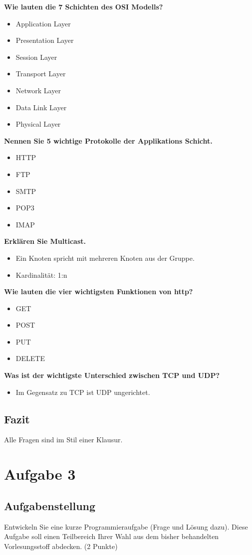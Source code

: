 \textbf{Wie lauten die 7 Schichten des OSI Modells?}
\begin{itemize}
	\item Application Layer
	\item Presentation Layer
	\item Session Layer
	\item Transport Layer
	\item Network Layer
	\item Data Link Layer
	\item Physical Layer
\end{itemize}
\textbf{Nennen Sie 5 wichtige Protokolle der Applikations Schicht.}
\begin{itemize}
	\item HTTP
	\item FTP
	\item SMTP
	\item POP3
	\item IMAP
\end{itemize}
\textbf{Erklären Sie Multicast.}
\begin{itemize}
	\item Ein Knoten spricht mit mehreren Knoten aus der Gruppe.
	\item Kardinalität: 1:n
\end{itemize}
\textbf{Wie lauten die vier wichtigsten Funktionen von http?}
\begin{itemize}
	\item GET
	\item POST
	\item PUT
	\item DELETE
\end{itemize}
\textbf{Was ist der wichtigste Unterschied zwischen TCP und UDP?}
\begin{itemize}
	\item Im Gegensatz zu TCP ist UDP ungerichtet.
\end{itemize}

\subsection{Fazit}
Alle Fragen sind im Stil einer Klausur.

\section{Aufgabe 3}

\subsection{Aufgabenstellung}
Entwickeln Sie eine kurze Programmieraufgabe (Frage und Lösung dazu). Diese Aufgabe soll einen Teilbereich Ihrer Wahl aus dem bisher behandelten Vorlesungsstoff abdecken. (2 Punkte)

